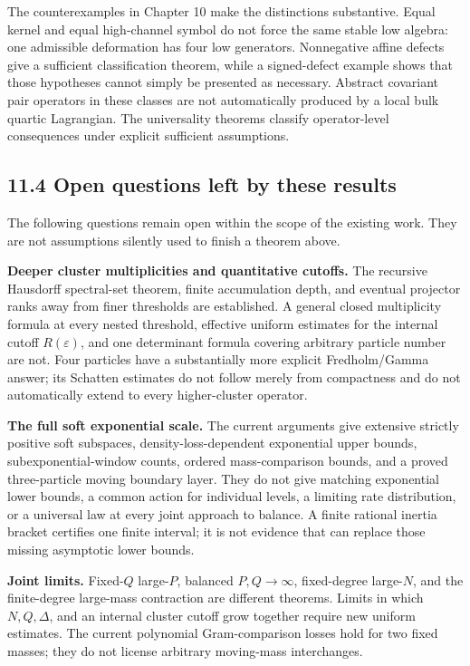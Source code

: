 \documentclass[a4paper,11pt]{article}
\numberwithin{equation}{section}
\begin{document}
The counterexamples in Chapter 10 make the distinctions substantive. Equal kernel and equal high-channel symbol do not force the same stable low algebra: one admissible deformation has four low generators. Nonnegative affine defects give a sufficient classification theorem, while a signed-defect example shows that those hypotheses cannot simply be presented as necessary. Abstract covariant pair operators in these classes are not automatically produced by a local bulk quartic Lagrangian. The universality theorems classify operator-level consequences under explicit sufficient assumptions.

\hypertarget{open-questions-left-by-these-results}{%
\subsection{11.4 Open questions left by these results}\label{open-questions-left-by-these-results}}

The following questions remain open within the scope of the existing work. They are not assumptions silently used to finish a theorem above.

\textbf{Deeper cluster multiplicities and quantitative cutoffs.} The recursive Hausdorff spectral-set theorem, finite accumulation depth, and eventual projector ranks away from finer thresholds are established. A general closed multiplicity formula at every nested threshold, effective uniform estimates for the internal cutoff \(R(\varepsilon)\), and one determinant formula covering arbitrary particle number are not. Four particles have a substantially more explicit Fredholm/Gamma answer; its Schatten estimates do not follow merely from compactness and do not automatically extend to every higher-cluster operator.

\textbf{The full soft exponential scale.} The current arguments give extensive strictly positive soft subspaces, density-loss-dependent exponential upper bounds, subexponential-window counts, ordered mass-comparison bounds, and a proved three-particle moving boundary layer. They do not give matching exponential lower bounds, a common action for individual levels, a limiting rate distribution, or a universal law at every joint approach to balance. A finite rational inertia bracket certifies one finite interval; it is not evidence that can replace those missing asymptotic lower bounds.

\textbf{Joint limits.} Fixed-\(Q\) large-\(P\), balanced \(P,Q\to\infty\), fixed-degree large-\(N\), and the finite-degree large-mass contraction are different theorems. Limits in which \(N,Q,\Delta\), and an internal cluster cutoff grow together require new uniform estimates. The current polynomial Gram-comparison losses hold for two fixed masses; they do not license arbitrary moving-mass interchanges.
\end{document}

